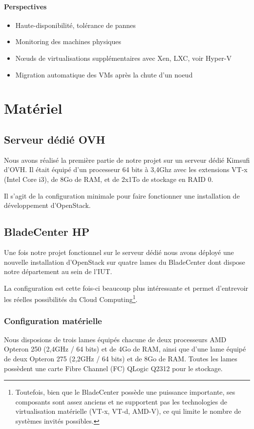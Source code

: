 \documentclass{report}
\begin{document}
\subsubsection{Perspectives}
\begin{itemize}
\item Haute-disponibilité, tolérance de pannes
\item Monitoring des machines physiques
\item Nœuds de virtualisations supplémentaires avec Xen, LXC, voir Hyper-V
\item Migration automatique des VMs après la chute d'un noeud
\end{itemize}


\chapter{Matériel}

\section{Serveur dédié OVH}
Nous avons réalisé la première partie de notre projet sur un serveur dédié Kimsufi d'OVH. Il était équipé d'un processeur 64 bits à 3,4Ghz avec les extensions VT-x (Intel Core i3), de 8Go de RAM, et de 2x1To de stockage en RAID 0.

Il s'agit de la configuration minimale pour faire fonctionner une installation de développement d'OpenStack.

\section{BladeCenter HP}
Une fois notre projet fonctionnel sur le serveur dédié nous avons déployé une nouvelle installation d'OpenStack sur quatre lames du BladeCenter dont dispose notre département au sein de l'IUT.

La configuration est cette fois-ci beaucoup plus intéressante et permet d'entrevoir les réelles possibilités du Cloud Computing\footnote{Toutefois, bien que le BladeCenter possède une puissance importante, ses composants sont assez anciens et ne supportent pas les technologies de virtualisation matérielle (VT-x, VT-d, AMD-V), ce qui limite le nombre de systèmes invités possibles.}.

\subsection{Configuration matérielle}
Nous disposions de trois lames équipés chacune de deux processeurs AMD Opteron 250 (2,4GHz / 64 bits) et de 4Go de RAM, ainsi que d'une lame équipé de deux Opteron 275 (2,2GHz / 64 bits) et de 8Go de RAM.\newline
Toutes les lames possèdent une carte Fibre Channel (FC) QLogic Q2312 pour le stockage.
\end{document}
